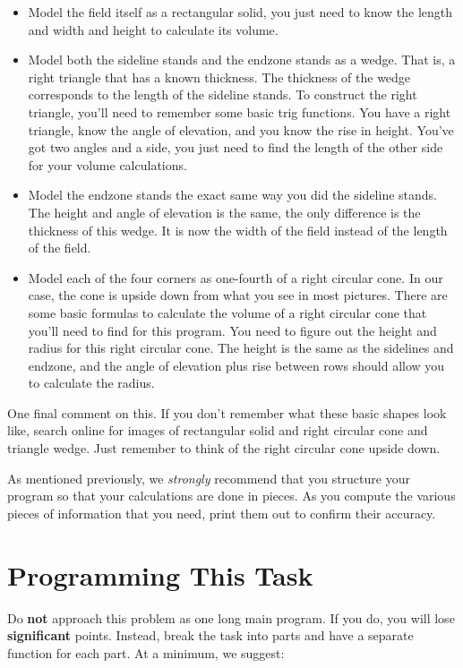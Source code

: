 \documentclass[12pt]{article}
\begin{document}
\begin{itemize}
\item Model the field itself as a rectangular solid, you just need to know the length
and width and height to calculate its volume.
\item Model both the sideline stands and the endzone stands as a wedge.  That is,
a right triangle that has a known thickness. The thickness of the wedge corresponds to the
length of the sideline stands.  To construct the right triangle, you'll need to remember
some basic trig functions.  You have a right triangle, know the angle of elevation,
and you know the rise in height.  You've got two angles and a side, you just need
to find the length of the other side for your volume calculations.
\item Model the endzone stands the exact same way you did the sideline stands.  The
height and angle of elevation is the same, the only difference is the thickness of this
wedge.  It is now the width of the field instead of the length of the field.
\item Model each of the four corners as one-fourth of a right circular cone.  In our case,
the cone is upside down from what you see in most pictures.  There are some
basic formulas to calculate the volume of a right circular cone that you'll need to
find for this program.  You need to figure out the height and radius for this
right circular cone.  The height is the same as the sidelines and endzone, and the
angle of elevation plus rise between rows should allow you to calculate the radius.
\end{itemize}

One final comment on this.  If you don't remember what these basic shapes look like, 
search online for images of rectangular solid and right circular cone and triangle wedge.
Just remember to think of the right circular cone upside down.

As mentioned previously, we {\it strongly} recommend that you structure your
program so that your calculations are done in pieces.  As you compute the
various pieces of information that you need, print them out to confirm their
accuracy.

\section*{Programming This Task}

Do {\bf not} approach this problem as one long main program.  If you do, you
will lose {\bf significant} points.  Instead, break the task into
parts and have a separate function for each part.  At a minimum, we suggest:
\end{document}
